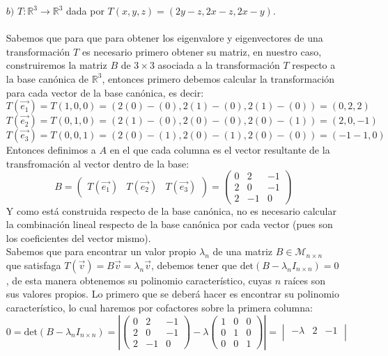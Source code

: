 \begin{itemize}
\begin{itemize}
\end{itemize}
\item[$b)$] $T: \mathbb{R}^3 \rightarrow \mathbb{R}^3$ dada por $T(x, y, z) = (2y - z, 2x - z, 2x -y)$.\\\\
Sabemos que para que para obtener los eigenvalore y eigenvectores de una transformaci\'on $T$ es necesario primero obtener su matriz, en nuestro caso, construiremos la matriz $B$ de $3\times 3$ asociada a la transformaci\'on $T$ respecto a la base can\'onica de $\mathbb{R}^3$, entonces primero debemos calcular la transformaci\'on para cada vector de la base can\'onica, es decir:
\[T(\vec{e_1})=T(1,0,0)=(2(0) - (0), 2(1) - (0), 2(1) -(0))=(0,2,2)\]
\[T(\vec{e_2})=T(0,1,0)=(2(1) - (0), 2(0) - (0), 2(0) -(1))=(2,0,-1)\]
\[T(\vec{e_3})=T(0,0,1)=(2(0) - (1), 2(0) - (1), 2(0) -(0))=(-1-1,0)\]
Entonces definimos a $A$ en el que cada columna es el vector resultante de la transfromaci\'on al vector dentro de la base:
\[B=\begin{pmatrix}T(\vec{e_1})&T(\vec{e_2})&T(\vec{e_3})\end{pmatrix}=\begin{pmatrix}0&2&-1\\2&0&-1\\2&-1&0\end{pmatrix}\]
Y como est\'a construida respecto de la base can\'onica, no es necesario calcular la combinaci\'on lineal respecto de la base can\'onica por cada vector (pues son los coeficientes del vector mismo).\\
Sabemos que para encontrar un valor propio $\lambda_n$ de una matriz $B\in\mathcal{M}_{n\times n }$ que satisfaga $T(\vec{v})=B\vec{v}=\lambda_n\vec{v}$, debemos tener que $\text{det}(B-\lambda_nI_{n\times n })=0$, de esta manera obtenemos su polinomio caracter\'istico, cuyas $n$ ra\'ices son sus valores propios.
Lo primero que se deber\'a hacer es encontrar su polinomio caracter\'istico, lo cual haremos por cofactores sobre la primera columna:
\[0=\text{det}(B-\lambda_nI_{n\times n })=\left|\begin{pmatrix}
0&2&-1\\
2&0&-1\\
2&-1&0
\end{pmatrix}-\lambda\begin{pmatrix}
1 &0&0\\0 &1&0\\0&0&1
\end{pmatrix}\right|=\begin{vmatrix}-\lambda&2&-1\\

\end{vmatrix}\]
\end{itemize}
